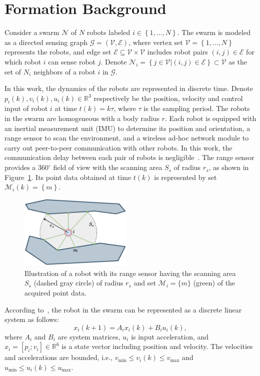 \section{Formation Background}\label{sec:problem}
Consider a swarm $\mathcal{N}$ of $N$ robots labeled $i\in\left\{1,...,N\right\}$. The swarm is modeled as a directed sensing graph $\mathcal{G}=\left(\mathcal{V},\mathcal{E}\right)$, where vertex set $\mathcal{V} = \left\{1,..., N\right\}$ represents the robots, and edge set $\mathcal{E}\subseteq\mathcal{V}\times \mathcal{V}$ includes robot pairs $\left(i, j\right)\in\mathcal{E}$ for which robot $i$ can sense robot $j$. Denote $\mathcal{N}_i=\left\{j\in\mathcal{V}|\left(i,j\right)\in\mathcal{E}\right\}\subset\mathcal{V}$ as the set of $N_i$ neighbors of a robot $i$ in $\mathcal{G}$.

In this work, the dynamics of the robots are represented in discrete time. Denote $p_i(k),v_i(k),u_i(k)\in\mathbb{R}^3$ respectively be the position, velocity and control input of robot $i$ at time $t(k) = k\tau$, where $\tau$ is the sampling period. The robots in the swarm are homogeneous with a body radius $r$. Each robot is equipped with an inertial measurement unit (IMU) to determine its position and orientation, a range sensor to scan the environment, and a wireless ad-hoc network module to carry out peer-to-peer communication with other robots. In this work, the communication delay between each pair of robots is negligible~\cite{AlonsoMora2018,9527169}. The range sensor provides a $360^\circ$ field of view with the scanning area $S_s$ of radius $r_s$, as shown in Figure~\ref{fig:model}. Its point data obtained at time $t(k)$ is represented by set $\mathcal{M}_i(k)=\left\{m\right\}$.
\begin{figure}
    \centering
    \includegraphics[width=0.48\textwidth]{paper3/images/model.pdf}
    \caption{Illustration of a robot with its range sensor having the scanning area $S_s$ (dashed gray circle) of radius $r_s$ and set $\mathcal{M}_i=\{m\}$ (green) of the acquired point data.}
    \label{fig:model}
\end{figure}

According to~\cite{Soria2021}, the robot in the swarm can be represented as a discrete linear system as follows:
\begin{equation}
    x_i(k+1)=A_ix_i(k) + B_iu_i(k),
\end{equation}
where $A_i$ and $B_i$ are system matrices, $u_i$ is input acceleration, and $x_i=\left[p_i;v_i\right]\in\mathbb{R}^6$ is a state vector including position and velocity. The velocities and accelerations are bounded, i.e., $v_\text{min}\leq v_i(k)\leq v_\text{max}$ and $u_\text{min}\leq u_i(k)\leq u_\text{max}$.